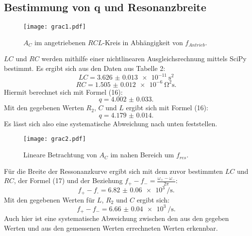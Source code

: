 \subsection{Bestimmung von q und Resonanzbreite}
\begin{figure}[H]
	\centering
	\caption{$A_C$ im angetriebenen $RCL$-Kreis in Abhängigkeit von $f_{Antrieb}$.}
	\texttt{[image: grac1.pdf]}
	\label{fig:grac1}
\end{figure}
$LC$ und $RC$ werden mithilfe einer nichtlinearen Ausgleichsrechnung mittels SciPy \cite{scipy} bestimmt. Es ergibt sich aus den Daten aus Tabelle 2: 
\begin{displaymath}
LC = \SI{3.626(13)e-11}{\second\squared}
\end{displaymath}
\begin{displaymath}
RC = \SI{1.505(12)e-6}{\ohm\squared\second}\text{.}
\end{displaymath}
Hiermit berechnet sich mit Formel (16):
\begin{displaymath}
q = \num{4.002(33)}\text{.}
\end{displaymath}
Mit den gegebenen Werten $R_2$, $C$ und $L$ ergibt sich mit Formel (16):
\begin{displaymath}
q = \num{4.179(14)}\text{.}
\end{displaymath}
Es lässt sich also eine systematische Abweichung  nach unten feststellen.


\begin{figure}[H]
	\centering
	\caption{Lineare Betrachtung von $A_C$ im nahen Bereich um $f_{res}$.}
	\texttt{[image: grac2.pdf]}
	\label{fig:grac2}
\end{figure}

Für die Breite der Ressonanzkurve ergibt sich mit dem zuvor bestimmten $LC$ und $RC$, der Formel (17) und der Beziehung $f_+ - f_- = \frac{\omega_+ - \omega_-}{2\pi}$:
\begin{displaymath}
f_\text{+} - f_\text{-} = \SI{6.82(6)e3}{\per\second}\text{.}
\end{displaymath}
Mit den gegebenen Werten für $L$, $R_2$ und $C$ ergibt sich:
\begin{displaymath}
f_+ - f_- = \SI{6.66(4)e3}{\per\second}\text{.}
\end{displaymath}
Auch hier ist eine systematische Abweichung zwischen den aus den gegeben Werten und aus den gemessenen Werten errechneten Werten erkennbar.


